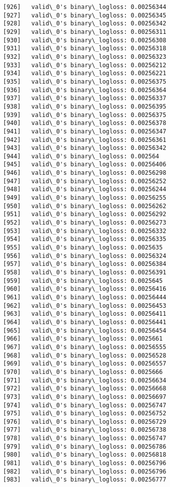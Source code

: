 \documentclass[11pt]{article}
\begin{document}
\begin{Verbatim}[commandchars=\\\{\}]
[926]	valid\_0's binary\_logloss: 0.00256344
[927]	valid\_0's binary\_logloss: 0.00256345
[928]	valid\_0's binary\_logloss: 0.00256342
[929]	valid\_0's binary\_logloss: 0.00256311
[930]	valid\_0's binary\_logloss: 0.00256308
[931]	valid\_0's binary\_logloss: 0.00256318
[932]	valid\_0's binary\_logloss: 0.00256323
[933]	valid\_0's binary\_logloss: 0.00256212
[934]	valid\_0's binary\_logloss: 0.00256221
[935]	valid\_0's binary\_logloss: 0.00256375
[936]	valid\_0's binary\_logloss: 0.00256364
[937]	valid\_0's binary\_logloss: 0.00256337
[938]	valid\_0's binary\_logloss: 0.00256395
[939]	valid\_0's binary\_logloss: 0.00256375
[940]	valid\_0's binary\_logloss: 0.00256378
[941]	valid\_0's binary\_logloss: 0.00256347
[942]	valid\_0's binary\_logloss: 0.00256361
[943]	valid\_0's binary\_logloss: 0.00256342
[944]	valid\_0's binary\_logloss: 0.002564
[945]	valid\_0's binary\_logloss: 0.00256406
[946]	valid\_0's binary\_logloss: 0.00256298
[947]	valid\_0's binary\_logloss: 0.00256252
[948]	valid\_0's binary\_logloss: 0.00256244
[949]	valid\_0's binary\_logloss: 0.00256255
[950]	valid\_0's binary\_logloss: 0.00256262
[951]	valid\_0's binary\_logloss: 0.00256292
[952]	valid\_0's binary\_logloss: 0.00256273
[953]	valid\_0's binary\_logloss: 0.00256332
[954]	valid\_0's binary\_logloss: 0.00256335
[955]	valid\_0's binary\_logloss: 0.0025635
[956]	valid\_0's binary\_logloss: 0.00256324
[957]	valid\_0's binary\_logloss: 0.00256384
[958]	valid\_0's binary\_logloss: 0.00256391
[959]	valid\_0's binary\_logloss: 0.0025645
[960]	valid\_0's binary\_logloss: 0.00256416
[961]	valid\_0's binary\_logloss: 0.00256444
[962]	valid\_0's binary\_logloss: 0.00256453
[963]	valid\_0's binary\_logloss: 0.00256411
[964]	valid\_0's binary\_logloss: 0.00256441
[965]	valid\_0's binary\_logloss: 0.00256454
[966]	valid\_0's binary\_logloss: 0.0025661
[967]	valid\_0's binary\_logloss: 0.00256555
[968]	valid\_0's binary\_logloss: 0.00256528
[969]	valid\_0's binary\_logloss: 0.00256557
[970]	valid\_0's binary\_logloss: 0.0025666
[971]	valid\_0's binary\_logloss: 0.00256634
[972]	valid\_0's binary\_logloss: 0.00256668
[973]	valid\_0's binary\_logloss: 0.00256697
[974]	valid\_0's binary\_logloss: 0.00256747
[975]	valid\_0's binary\_logloss: 0.00256752
[976]	valid\_0's binary\_logloss: 0.00256729
[977]	valid\_0's binary\_logloss: 0.00256738
[978]	valid\_0's binary\_logloss: 0.00256747
[979]	valid\_0's binary\_logloss: 0.00256786
[980]	valid\_0's binary\_logloss: 0.00256818
[981]	valid\_0's binary\_logloss: 0.00256796
[982]	valid\_0's binary\_logloss: 0.00256796
[983]	valid\_0's binary\_logloss: 0.00256777

\end{Verbatim}
\end{document}
